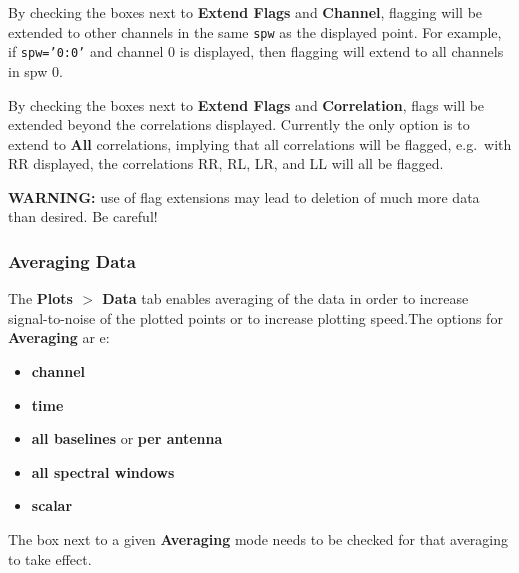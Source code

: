 By checking the boxes next to {\bf Extend Flags} and {\bf Channel}, flagging will be extended to other channels in the same {\tt spw} as the displayed point.  For example, if {\tt spw='0:0'} and channel 0 is displayed, then flagging will extend to all channels in spw 0.

By checking the boxes next to {\bf Extend Flags} and {\bf Correlation}, flags will be extended beyond the correlations displayed. Currently the only option is to extend to {\bf All} correlations, implying that all correlations will be flagged, e.g.\ with RR displayed, the correlations RR, RL, LR, and LL will all be flagged. 


{\bf WARNING:} use of flag extensions may lead to deletion of much more data than desired.  Be careful!




\subsubsection{Averaging Data}
\label{section:edit.plot.plotms.average}

The {\bf Plots $>$ Data} tab enables averaging of the data in order to increase signal-to-noise of the plotted points or to increase plotting speed.The options for {\bf Averaging} ar e: 
\begin{itemize}
   \item {\bf channel}
   \item {\bf time}
   \item {\bf all baselines} or {\bf per antenna}
   \item {\bf all spectral windows}
   \item {\bf scalar}
\end{itemize}
The box next to a given {\bf Averaging} mode needs to be checked for that averaging to take effect.

